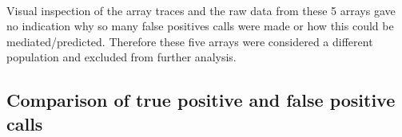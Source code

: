 \paragraph*{}
Visual inspection of the array traces and the raw data from these 5 arrays gave no indication why so many false positives calls were made or how this could be mediated/predicted. Therefore these five arrays were considered a different population and excluded from further analysis.
\subsection{Comparison of true positive and false positive calls}
\begin{table}[]
\centering
\caption[Calls made in 81 training cases after removal of outliers]{The calls made in 81 training cases using a range of Z score thresholds. The true positive call was missed in at least 5 cases across all thresholds, with a false positive call made in at least 1 in 4 cases. The number of false positive calls, and the average number of calls made decreased as the Z score threshold increased.}
\label{tab:training_set_calls}
\end{table}
